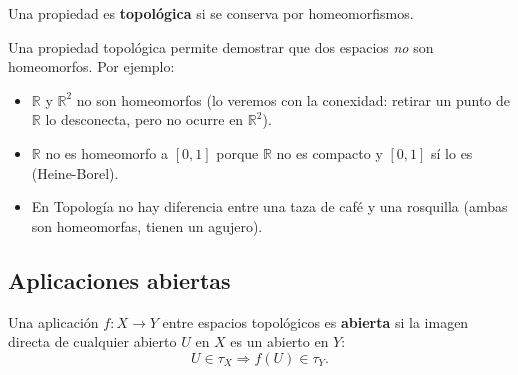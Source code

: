 

\begin{definición}
    Una propiedad es \textbf{topológica} si se conserva por homeomorfismos.
\end{definición}

\begin{observación}
    Una propiedad topológica permite demostrar que dos espacios \emph{no} son homeomorfos. Por ejemplo:
    \begin{itemize}
        \item $\mathbb{R}$ y $\mathbb{R}^2$ no son homeomorfos (lo veremos con la conexidad: retirar un punto de $\mathbb{R}$ lo desconecta, pero no ocurre en $\mathbb{R}^2$).
        \item $\mathbb{R}$ no es homeomorfo a $[0,1]$ porque $\mathbb{R}$ no es compacto y $[0,1]$ sí lo es (Heine-Borel).
        \item En Topología no hay diferencia entre una taza de café y una rosquilla (ambas son homeomorfas, tienen un agujero).
    \end{itemize}
\end{observación}


\subsection{Aplicaciones abiertas}

\begin{definición}
    Una aplicación $f: X \to Y$ entre espacios topológicos es \textbf{abierta} si la imagen directa de cualquier abierto $U$ en $X$ es un abierto en $Y$:
    $$U \in \tau_X \Rightarrow f(U) \in \tau_Y.$$
\end{definición}


